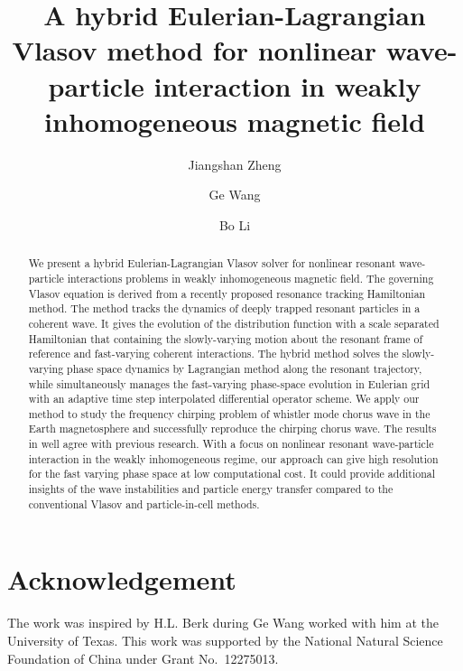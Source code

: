 \documentclass[times,12pt,3p,longtitle]{elsarticle}
\begin{document}
\begin{frontmatter}
\title{A hybrid Eulerian-Lagrangian Vlasov method for nonlinear wave-particle interaction in weakly inhomogeneous magnetic field}
\author[1]{Jiangshan Zheng}
\author[2,3]{Ge Wang}
\author[1]{Bo Li}

\address[1]{School of Physics, Beihang University, Beijing, Beijing 100191, China}
\address[2]{Institute for Fusion Studies, University of Texas at Austin, Austin, Texas, 78712, USA}
\address[3]{Center for Plasma Theory and Computation, University of Wisconsin at Madison, Madison, Wisconsin 53706, USA}
\begin{abstract}
  We present a hybrid Eulerian-Lagrangian Vlasov solver for nonlinear resonant wave-particle interactions problems in weakly inhomogeneous magnetic field.
  The governing Vlasov equation is derived from a recently proposed resonance tracking Hamiltonian method. 
  The method tracks the dynamics of deeply trapped resonant particles in a coherent wave. 
  It gives the evolution of the distribution function with a scale separated Hamiltonian that containing the slowly-varying motion about the resonant frame of reference and fast-varying coherent interactions.
  The hybrid method solves the slowly-varying phase space dynamics by Lagrangian method along the resonant trajectory, while simultaneously manages the fast-varying phase-space evolution in Eulerian grid with an adaptive time step interpolated differential operator scheme.
  We apply our method to study the frequency chirping problem of whistler mode chorus wave in the Earth magnetosphere and successfully reproduce the chirping chorus wave. 
  The results in well agree with previous research. 
  With a focus on nonlinear resonant wave-particle interaction in the weakly inhomogeneous regime, our approach can give high resolution for the fast varying phase space at low computational cost.  
  It could provide additional insights of the wave instabilities and particle energy transfer compared to the conventional Vlasov and particle-in-cell methods.
\end{abstract}
\end{frontmatter}

\clearpage











\section*{Acknowledgement}
    The work was inspired by H.L. Berk during Ge Wang worked with him at the University of Texas.
    This work was supported by the National Natural Science Foundation of China under Grant No.~12275013.



\end{document}
